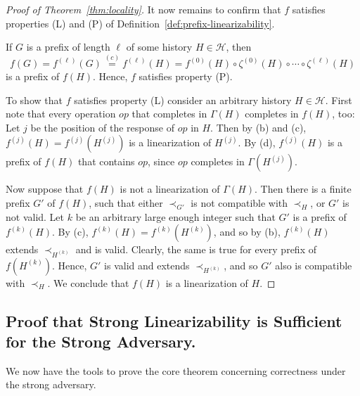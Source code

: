 \documentclass[11pt,letterpaper]{article}
\newcommand{\HH}{\mathcal{H}}
\begin{document}
\begin{proof}[Proof of Theorem~\ref{thm:locality}]
It now remains to confirm that $f$
satisfies properties (L) and (P) of Definition~\ref{def:prefix-linearizability}.

If $G$ is a prefix of length $\ell$ of some history $H\in\HH$, then
\begin{displaymath}
  f(G)
  =
  f^{(\ell)}(G)
  \stackrel{(c)}{=}
  f^{(\ell)}(H)
  =
  f^{(0)}(H)\circ\zeta^{(0)}(H)\circ\cdots \circ\zeta^{(\ell)}(H)
\end{displaymath}
is a prefix of $f(H)$.
Hence, $f$ satisfies property (P).

To show that $f$ satisfies property (L) consider an arbitrary history $H\in\HH$.
First note that every operation $op$ that completes in $\Gamma(H)$ completes in $f(H)$, too:
Let $j$ be the position of the response of $op$ in $H$.
Then by (b) and (c), $f^{(j)}(H)=f^{(j)}(H^{(j)})$ is a linearization of $H^{(j)}$.
By (d), $f^{(j)}(H)$ is a prefix of $f(H)$ that contains $op$, since $op$ completes in $\Gamma(H^{(j)})$.

Now suppose that $f(H)$ is not a linearization of $\Gamma(H)$.
Then there is a finite prefix $G'$ of $f(H)$, such that either $\prec_{G'}$ is not compatible with $\prec_H$, or $G'$ is not valid.
Let $k$ be an arbitrary large enough integer such that $G'$ is a prefix of $f^{(k)}(H)$.
By (c), $f^{(k)}(H)=f^{(k)}(H^{(k)})$, and so by (b), $f^{(k)}(H)$ extends $\prec_{H^{(k)}}$ and is valid.
Clearly, the same is true for every prefix of $f(H^{(k)})$.
Hence, $G'$ is valid and extends $\prec_{H^{(k)}}$,
and so $G'$ also is compatible with $\prec_H$.
We conclude that $f(H)$ is a linearization of $H$.
\end{proof}

\subsection{Proof that Strong Linearizability is Sufficient for the Strong Adversary.}
We now have the tools to prove the core theorem concerning correctness under the strong adversary.
\end{document}

